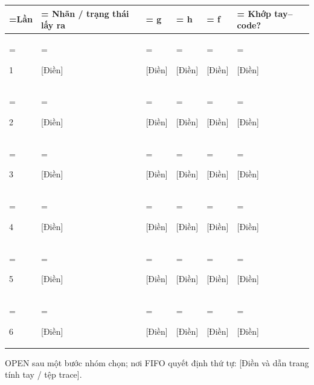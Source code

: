 \documentclass[11pt,a4paper]{article}
\begin{document}
\par\begingroup\footnotesize\renewcommand{\arraystretch}{1.5}
\begin{tabularx}{\linewidth}{>{\hsize=0.3488\hsize\linewidth=\hsize}X>{\hsize=2.4419\hsize\linewidth=\hsize}X>{\hsize=0.5233\hsize\linewidth=\hsize}X>{\hsize=0.5233\hsize\linewidth=\hsize}X>{\hsize=0.5233\hsize\linewidth=\hsize}X>{\hsize=1.6395\hsize\linewidth=\hsize}X}\toprule
\textbf{Lần} & \textbf{Nhãn / trạng thái lấy ra} & \textbf{g} & \textbf{h} & \textbf{f} & \textbf{Khớp tay–code?}\\\midrule
\strut 1 & \strut [Điền] & \strut [Điền] & \strut [Điền] & \strut [Điền] & \strut [Điền]\\
\strut 2 & \strut [Điền] & \strut [Điền] & \strut [Điền] & \strut [Điền] & \strut [Điền]\\
\strut 3 & \strut [Điền] & \strut [Điền] & \strut [Điền] & \strut [Điền] & \strut [Điền]\\
\strut 4 & \strut [Điền] & \strut [Điền] & \strut [Điền] & \strut [Điền] & \strut [Điền]\\
\strut 5 & \strut [Điền] & \strut [Điền] & \strut [Điền] & \strut [Điền] & \strut [Điền]\\
\strut 6 & \strut [Điền] & \strut [Điền] & \strut [Điền] & \strut [Điền] & \strut [Điền]\\
\bottomrule\end{tabularx}\endgroup\par\medskip
OPEN sau một bước nhóm chọn; nơi FIFO quyết định thứ tự: [Điền và dẫn trang tính tay / tệp trace].\par\medskip
\end{document}
